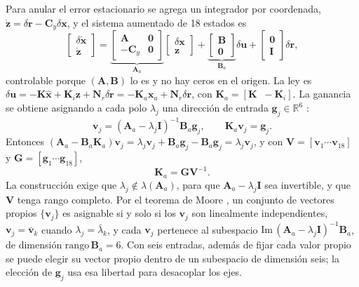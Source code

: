 \documentclass[conference]{IEEEtran}
\newcommand{\vect}[1]{\bm{#1}}
\begin{document}
Para anular el error estacionario se agrega un integrador por coordenada, $\dot{\vect z} = \delta\vect r - \vect C_y\delta\vect x$, y el sistema aumentado de 18 estados es
\begin{equation}
\begin{bmatrix}\delta\dot{\vect x}\\ \dot{\vect z}\end{bmatrix} = \underbrace{\begin{bmatrix}\vect A & \vect 0\\ -\vect C_y & \vect 0\end{bmatrix}}_{\vect A_a}\begin{bmatrix}\delta\vect x\\ \vect z\end{bmatrix} + \underbrace{\begin{bmatrix}\vect B\\ \vect 0\end{bmatrix}}_{\vect B_a}\delta\vect u + \begin{bmatrix}\vect 0\\ \vect I\end{bmatrix}\delta\vect r ,
\end{equation}
controlable porque $(\vect A, \vect B)$ lo es y no hay ceros en el origen. La ley es $\delta\vect u = -\vect K\hat{\vect x} + \vect K_i\vect z + \vect N_r\delta\vect r = -\vect K_a\vect x_a + \vect N_r\delta\vect r$, con $\vect K_a = [\vect K\;\;-\vect K_i]$. La ganancia se obtiene asignando a cada polo $\lambda_j$ una dirección de entrada $\vect g_j\in\mathbb R^6$ \cite{moore1976}:
\begin{equation}
\vect v_j = (\vect A_a - \lambda_j\vect I)^{-1}\vect B_a\vect g_j,\qquad \vect K_a\vect v_j = \vect g_j .
\end{equation}
Entonces $(\vect A_a - \vect B_a\vect K_a)\vect v_j = \lambda_j\vect v_j + \vect B_a\vect g_j - \vect B_a\vect g_j = \lambda_j\vect v_j$, y con $\vect V = [\vect v_1\cdots\vect v_{18}]$ y $\vect G = [\vect g_1\cdots\vect g_{18}]$,
\begin{equation}
\vect K_a = \vect G\vect V^{-1}.
\end{equation}
La construcción exige que $\lambda_j\notin\lambda(\vect A_a)$, para que $\vect A_a - \lambda_j\vect I$ sea invertible, y que $\vect V$ tenga rango completo. Por el teorema de Moore \cite{moore1976}, un conjunto de vectores propios $\{\vect v_j\}$ es asignable si y solo si los $\vect v_j$ son linealmente independientes, $\vect v_j = \bar{\vect v}_k$ cuando $\lambda_j = \bar\lambda_k$, y cada $\vect v_j$ pertenece al subespacio $\mathrm{Im}\,(\vect A_a - \lambda_j\vect I)^{-1}\vect B_a$, de dimensión $\mathrm{rango}\,\vect B_a = 6$. Con seis entradas, además de fijar cada valor propio se puede elegir su vector propio dentro de un subespacio de dimensión seis; la elección de $\vect g_j$ usa esa libertad para desacoplar los ejes.
\end{document}
